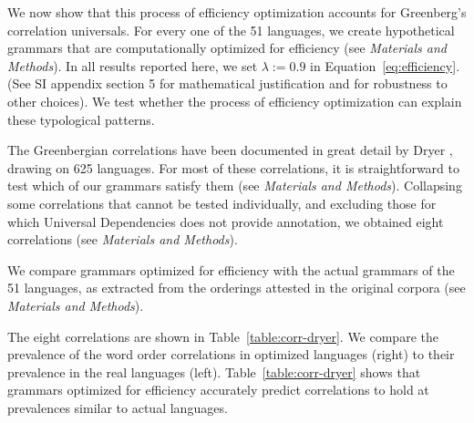 \documentclass[9pt,twocolumn,twoside,lineno]{pnas-new}
\begin{document}
We now show that this process of efficiency optimization accounts for Greenberg's correlation universals. %
For every one of the 51 languages, we create hypothetical grammars that are computationally optimized for efficiency (see \textit{Materials and Methods}).
In all results reported here, we set $\lambda := 0.9$ in Equation~\ref{eq:efficiency}.
(See SI appendix section 5 for mathematical justification and for robustness to other choices).
We test whether the process of efficiency optimization can explain these typological patterns. %



The Greenbergian correlations have been documented in great detail by Dryer \cite{dryer1992greenbergian}, drawing on 625 languages.
For most of these correlations, it is straightforward to test which of our grammars satisfy them (see \textit{Materials and Methods}).
Collapsing some correlations that cannot be tested individually, and excluding those for which Universal Dependencies does not provide annotation, we obtained eight correlations  (see \textit{Materials and Methods}).

We compare grammars optimized for efficiency with the actual grammars of the 51 languages, as extracted from the orderings attested in the original corpora (see \textit{Materials and Methods}).

The eight correlations are shown in Table~\ref{table:corr-dryer}.
We compare the prevalence of the word order correlations in optimized languages (right) to their prevalence in the real languages (left).
Table~\ref{table:corr-dryer} shows that grammars optimized for efficiency accurately predict correlations to hold at prevalences similar to actual languages.
\end{document}

